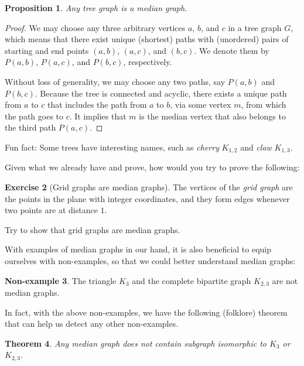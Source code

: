 \documentclass[12pt, a4paper]{article}
\theoremstyle{plain}
\newtheorem{theorem}{Theorem}[section]
\newtheorem{proposition}[theorem]{Proposition}
\theoremstyle{definition}
\newtheorem{non-example}[theorem]{Non-example}
\newtheorem{exercise}[theorem]{Exercise}
\theoremstyle{remark}
\begin{document}
    \begin{proposition}
        Any tree graph is a median graph.
    \end{proposition}
    
    \begin{proof}
        We may choose any three arbitrary vertices $a$, $b$, and $c$ in a tree graph $G$, which means that there exist unique (shortest) paths with (unordered) pairs of starting and end points $(a, b)$, $(a, c)$, and $(b, c)$. We denote them by $P(a, b)$, $P(a, c)$, and $P(b, c)$, respectively.
        
        Without loss of generality, we may choose any two paths, say $P(a, b)$ and $P(b, c)$. Because the tree is connected and acyclic, there exists a unique path from $a$ to $c$ that includes the path from $a$ to $b$, via some vertex $m$, from which the path goes to $c$. It implies that $m$ is the median vertex that also belongs to the third path $P(a, c)$.
    \end{proof}
    
    Fun fact: Some trees have interesting names, such as \textit{cherry} $K_{1, 2}$ and \textit{claw} $K_{1, 3}$.
    
    Given what we already have and prove, how would you try to prove the following:
    
    \begin{exercise}[Grid graphs are median graphs]
        The vertices of the \textit{grid graph} are the points in the plane with integer coordinates, and they form edges whenever two points are at distance $1$.
        
        Try to show that grid graphs are median graphs.
    \end{exercise}
    
    With examples of median graphs in our hand, it is also beneficial to equip ourselves with non-examples, so that we could better understand median graphs:
    
    \begin{non-example}
        The triangle $K_{3}$ and the complete bipartite graph $K_{2, 3}$ are not median graphs.
    \end{non-example}
    
    In fact, with the above non-examples, we have the following (folklore) theorem that can help us detect any other non-examples.
    
    \begin{theorem}
        Any median graph does not contain subgraph isomorphic to $K_{3}$ or $K_{2, 3}$.
    \end{theorem}
    
\end{document}
